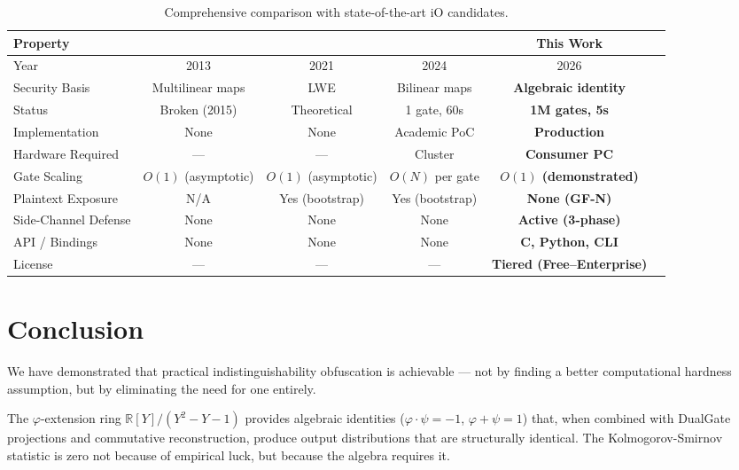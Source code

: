 \documentclass[11pt,a4paper]{article}
\begin{document}
\begin{table}[h]
\centering
\begin{tabular}{lccccc}
\toprule
\textbf{Property} & \textbf{\cite{GGH13}} & \textbf{\cite{JLS21}} & \textbf{\cite{WWW24}} & \textbf{This Work} \\
\midrule
Year & 2013 & 2021 & 2024 & 2026 \\
Security Basis & Multilinear maps & LWE & Bilinear maps & \textbf{Algebraic identity} \\
Status & Broken (2015) & Theoretical & 1 gate, 60s & \textbf{1M gates, 5s} \\
Implementation & None & None & Academic PoC & \textbf{Production} \\
Hardware Required & — & — & Cluster & \textbf{Consumer PC} \\
Gate Scaling & $O(1)$ (asymptotic) & $O(1)$ (asymptotic) & $O(N)$ per gate & \textbf{$O(1)$ (demonstrated)} \\
Plaintext Exposure & N/A & Yes (bootstrap) & Yes (bootstrap) & \textbf{None (GF-N)} \\
Side-Channel Defense & None & None & None & \textbf{Active (3-phase)} \\
API / Bindings & None & None & None & \textbf{C, Python, CLI} \\
License & — & — & — & \textbf{Tiered (Free–Enterprise)} \\
\bottomrule
\end{tabular}
\caption{Comprehensive comparison with state-of-the-art iO candidates.}
\label{tab:comparison}
\end{table}

\section{Conclusion}

We have demonstrated that practical indistinguishability obfuscation is achievable — not by finding a better computational hardness assumption, but by eliminating the need for one entirely.

The $\varphi$-extension ring $\mathbb{R}[Y]/(Y^2-Y-1)$ provides algebraic identities ($\varphi \cdot \psi = -1$, $\varphi + \psi = 1$) that, when combined with DualGate projections and commutative reconstruction, produce output distributions that are structurally identical. The Kolmogorov-Smirnov statistic is zero not because of empirical luck, but because the algebra requires it.
\end{document}
